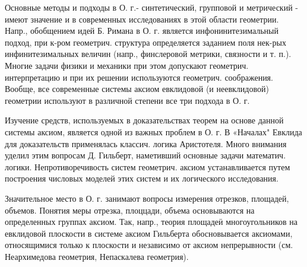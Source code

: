 \documentclass[10pt]{article}
\begin{document}
Основные методы и подходы в О. г.- синтетический, групповой и метрический - имеют значение и в современных исследованиях в этой области геометрии. Напр., обобщением идей Б. Римана в О. г. является инфонинитезимальный подход, при к-ром геометрич. структура определяется заданием поля нек-рых инфинитезимальных величин (напр., финслеровой метрики, связности и т. п.). Многие задачи физики и механики при этом допускают геометрич. интерпретацию и при их решении используются геометрич. соображения. Вообще, все современные системы аксиом евклидовой (и неевклидовой) геометрии используют в различной степени все три подхода в О. г.



Изучение средств, используемых в доказательствах теорем на основе данной системы аксиом, является одной из важных проблем в О. г. В «Началах" Евклида для доказательств применялась классич. логика Аристотеля. Много внимания уделил этим вопросам Д. Гильберт, наметивший основные задачи математич. логики. Непротиворечивость систем геометрич. аксиом устанавливается путем построения числовых моделей этих систем и их логического исследования.



Значительное место в О. г. занимают вопросы измерения отрезков, площадей, объемов. Понятия меры отрезка, плоццади, объема основываются на определенных группах аксиом. Так, напр., теория площадеӥ многоугольников на евклидовой плоскости в системе аксиом Гильберта обосновывается аксиомами, относящимися только к плоскости и независимо от аксиом непрерывности (см. Неархимедова геометрия, Непаскалева геометрия).
\end{document}
